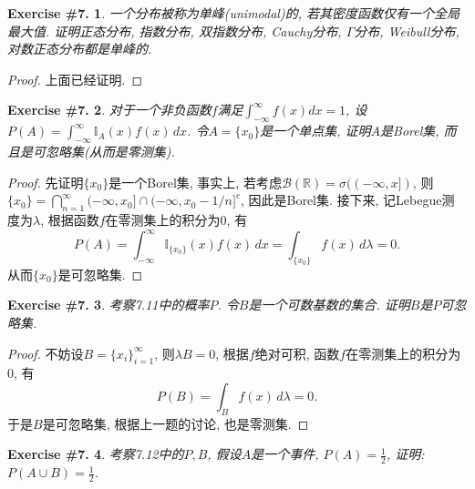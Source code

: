 \documentclass[UTF8, a4paper]{article}
\newtheorem{exercise}{Exercise \#7.}
\begin{document}
\begin{framed}
\begin{exercise}
一个分布被称为单峰(unimodal)的, 若其密度函数仅有一个全局最大值. 证明正态分布, 指数分布, 双指数分布, Cauchy分布, $\Gamma$分布, Weibull分布, 对数正态分布都是单峰的.
\end{exercise}
\end{framed}

\begin{proof}
上面已经证明.
\end{proof}

\begin{framed}
\begin{exercise}
对于一个非负函数$f$满足$\int_{-\infty}^{\infty} f(x) d x=1$, 设$P(A) = \int_{-\infty}^{\infty} \mathbb{I}_A(x)f(x) \,dx$.
令\(A = \{x_0\}\)是一个单点集, 证明$A$是Borel集, 而且是可忽略集(从而是零测集).
\end{exercise}
\end{framed}
\begin{proof}
先证明\(\{x_0\}\)是一个Borel集, 
事实上, 若考虑\(\mathcal{B}(\mathbb{R}) = \sigma((-\infty, x])\), 则\(\{x_0\} = \bigcap_{n=1}^{\infty} (-\infty, x_0] \cap (-\infty, x_0 - 1/n]^c\), 因此是Borel集.
接下来, 记Lebegue测度为\(\lambda\), 根据函数\(f\)在零测集上的积分为\(0\), 有
$$
P(A) = \int_{-\infty}^{\infty} \mathbb{I}_{\{x_0\}}(x)f(x) \,dx = \int_{\{x_0\}} f(x) \,d\lambda = 0.
$$
从而\(\{x_0\}\)是可忽略集.
\end{proof}



\begin{framed}
\begin{exercise}
考察7.11中的概率$P$. 令$B$是一个可数基数的集合. 证明$B$是$P$可忽略集.
\end{exercise}
\end{framed}
\begin{proof}
不妨设\(B = \{x_i\}_{i = 1}^\infty\), 则\(\lambda B = 0\), 根据\(f\)绝对可积, 函数\(f\)在零测集上的积分为\(0\), 有
$$
P(B) = \int_{B} f(x) \,d\lambda = 0.
$$
于是\(B\)是可忽略集, 根据上一题的讨论, 也是零测集.
\end{proof}

\begin{framed}
\begin{exercise}
考察7.12中的$P, B$, 假设$A$是一个事件, $P(A) = \frac{1}{2}$, 证明: \(P(A \cup B) = \frac{1}{2}\).
\end{exercise}
\end{framed}
\end{document}
